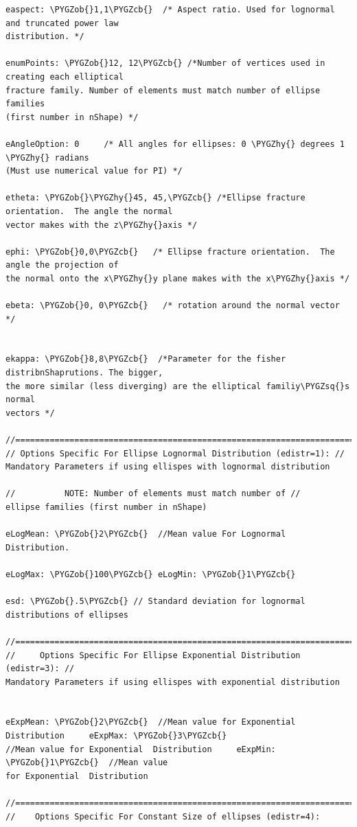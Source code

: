 \documentclass[letterpaper,10pt,english]{sphinxmanual}
\def\PYGZob{\char`\{}
\def\PYGZcb{\char`\}}
\def\PYGZhy{\char`\-}
\def\PYGZsq{\char`\'}
\renewcommand\PYGZsq{\textquotesingle}
\begin{document}
\begin{Verbatim}[commandchars=\\\{\}]
easpect: \PYGZob{}1,1\PYGZcb{}  /* Aspect ratio. Used for lognormal and truncated power law
distribution. */

enumPoints: \PYGZob{}12, 12\PYGZcb{} /*Number of vertices used in creating each elliptical
fracture family. Number of elements must match number of ellipse families
(first number in nShape) */

eAngleOption: 0     /* All angles for ellipses: 0 \PYGZhy{} degrees 1 \PYGZhy{} radians
(Must use numerical value for PI) */

etheta: \PYGZob{}\PYGZhy{}45, 45,\PYGZcb{} /*Ellipse fracture orientation.  The angle the normal
vector makes with the z\PYGZhy{}axis */

ephi: \PYGZob{}0,0\PYGZcb{}   /* Ellipse fracture orientation.  The angle the projection of
the normal onto the x\PYGZhy{}y plane makes with the x\PYGZhy{}axis */

ebeta: \PYGZob{}0, 0\PYGZcb{}   /* rotation around the normal vector */


ekappa: \PYGZob{}8,8\PYGZcb{}  /*Parameter for the fisher distribnShaprutions. The bigger,
the more similar (less diverging) are the elliptical familiy\PYGZsq{}s normal
vectors */

//===========================================================================
// Options Specific For Ellipse Lognormal Distribution (edistr=1): //
Mandatory Parameters if using ellispes with lognormal distribution

//          NOTE: Number of elements must match number of //
ellipse families (first number in nShape)

eLogMean: \PYGZob{}2\PYGZcb{}  //Mean value For Lognormal Distribution.

eLogMax: \PYGZob{}100\PYGZcb{} eLogMin: \PYGZob{}1\PYGZcb{}

esd: \PYGZob{}.5\PYGZcb{} // Standard deviation for lognormal distributions of ellipses

//===========================================================================
//     Options Specific For Ellipse Exponential Distribution (edistr=3): //
Mandatory Parameters if using ellispes with exponential distribution


eExpMean: \PYGZob{}2\PYGZcb{}  //Mean value for Exponential  Distribution     eExpMax: \PYGZob{}3\PYGZcb{}
//Mean value for Exponential  Distribution     eExpMin: \PYGZob{}1\PYGZcb{}  //Mean value
for Exponential  Distribution

//===========================================================================
//    Options Specific For Constant Size of ellipses (edistr=4):


\end{Verbatim}
\end{document}
